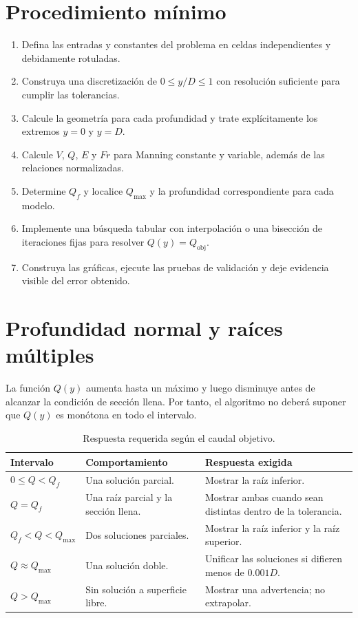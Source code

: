 \documentclass[12pt]{article}
\begin{document}
\section{Procedimiento mínimo}
\begin{enumerate}
\item Defina las entradas y constantes del problema en celdas independientes y debidamente rotuladas.
\item Construya una discretización de $0\leq y/D\leq1$ con resolución suficiente para cumplir las tolerancias.
\item Calcule la geometría para cada profundidad y trate explícitamente los extremos $y=0$ y $y=D$.
\item Calcule $V$, $Q$, $E$ y $Fr$ para Manning constante y variable, además de las relaciones normalizadas.
\item Determine $Q_f$ y localice $Q_{\max}$ y la profundidad correspondiente para cada modelo.
\item Implemente una búsqueda tabular con interpolación o una bisección de iteraciones fijas para resolver $Q(y)=Q_{\mathrm{obj}}$.
\item Construya las gráficas, ejecute las pruebas de validación y deje evidencia visible del error obtenido.
\end{enumerate}

\section{Profundidad normal y raíces múltiples}
La función $Q(y)$ aumenta hasta un máximo y luego disminuye antes de alcanzar la condición de sección llena. Por tanto, el algoritmo no deberá suponer que $Q(y)$ es monótona en todo el intervalo.

\begin{table}[H]
\centering
\caption{Respuesta requerida según el caudal objetivo.}
\begin{tabularx}{\textwidth}{>{\raggedright\arraybackslash}p{} >{\raggedright\arraybackslash}p{} >{\raggedright\arraybackslash}X}
\toprule
\textbf{Intervalo} & \textbf{Comportamiento} & \textbf{Respuesta exigida} \\
\midrule
$0\leq Q<Q_f$ & Una solución parcial. & Mostrar la raíz inferior. \\
$Q=Q_f$ & Una raíz parcial y la sección llena. & Mostrar ambas cuando sean distintas dentro de la tolerancia. \\
$Q_f<Q<Q_{\max}$ & Dos soluciones parciales. & Mostrar la raíz inferior y la raíz superior. \\
$Q\approx Q_{\max}$ & Una solución doble. & Unificar las soluciones si difieren menos de $0.001D$. \\
$Q>Q_{\max}$ & Sin solución a superficie libre. & Mostrar una advertencia; no extrapolar. \\
\bottomrule
\end{tabularx}
\end{table}
\end{document}
